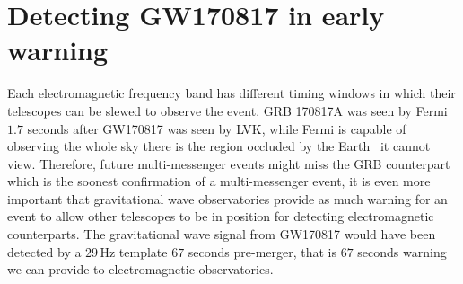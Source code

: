 \section{\label{6:sec:gw170817-in-ew}Detecting GW170817 in early warning}

Each electromagnetic frequency band has different timing windows in which their telescopes can be slewed to observe the event. GRB 170817A was seen by Fermi $1.7$ seconds after GW170817 was seen by LVK, while Fermi is capable of observing the whole sky there is the region occluded by the Earth~\cite{Fermi:2022} it cannot view. Therefore, future multi-messenger events might miss the GRB counterpart which is the soonest confirmation of a multi-messenger event, it is even more important that gravitational wave observatories provide as much warning for an event to allow other telescopes to be in position for detecting electromagnetic counterparts. The gravitational wave signal from GW170817 would have been detected by a $29 \, \text{Hz}$ template $67$ seconds pre-merger, that is $67$ seconds warning we can provide to electromagnetic observatories.

